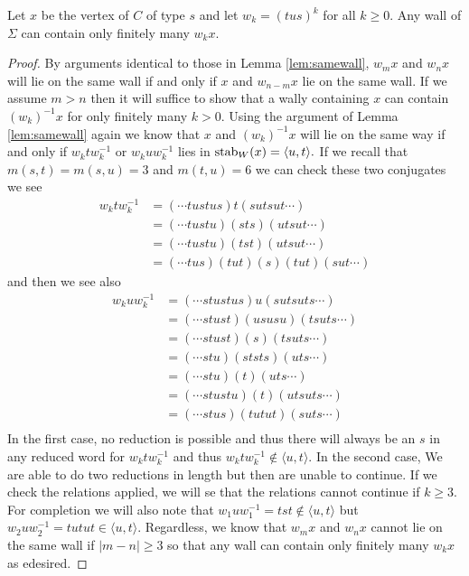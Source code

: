 \documentclass[class=book, crop=false]{standalone}
\begin{document}
\begin{lemma}
	\label{lem:336f2walls}
	Let $x$ be the vertex of $C$ of type $s$ and let $w_k=(tus)^k$ for all $k\ge 0.$ Any wall of $\Sigma$ can contain only finitely many $w_kx.$
\end{lemma}
\begin{proof}
	By arguments identical to those in Lemma \ref{lem:samewall}, $w_mx$ and $w_{n}x$ will lie on the same wall if and only if $x$ and $w_{n-m}x$ lie on the same wall. If we assume $m>n$ then it will suffice to show that a wally containing $x$ can contain $(w_k)^{-1}x$ for only finitely many $k>0.$ Using the argument of Lemma \ref{lem:samewall} again we know that $x$ and $(w_k)^{-1}x$ will lie on the same way if and only if $w_ktw_k^{-1}$ or $w_kuw_k^{-1}$ lies in $\mathrm{stab}_{W}(x)=\langle u,t\rangle.$ If we recall that $m(s,t)=m(s,u)=3$ and $m(t,u)=6$ we can check these two conjugates we see 
\begin{align*}
	w_ktw_k^{-1}&=(\cdots tustus)t(sutsut\cdots)\\
		    &=(\cdots tustu)(sts)(utsut\cdots)\\
		    &=(\cdots tustu)(tst)(utsut\cdots)\\
		    &=(\cdots tus)(tut)(s)(tut)(sut\cdots)
\end{align*}
and then we see also
\begin{align*}
	w_kuw_k^{-1}&=(\cdots stustus)u(sutsuts\cdots)\\
		    &=(\cdots stust)(ususu)(tsuts\cdots)\\
		    &=(\cdots stust)(s)(tsuts\cdots)\\
		    &=(\cdots stu)(ststs)(uts\cdots)\\
		    &=(\cdots stu)(t)(uts\cdots)\\
		    &=(\cdots stustu)(t)(utsuts\cdots)\\
		    &=(\cdots stus)(tutut)(suts\cdots)\\
\end{align*}
In the first case, no reduction is possible and thus there will always be an $s$ in any reduced word for $w_ktw_k^{-1}$ and thus $w_ktw_k^{-1}\not\in \langle u,t \rangle.$ In the second case, We are able to do two reductions in length but then are unable to continue. If we check the relations applied, we will se that the relations cannot continue if $k\ge 3.$ For completion we will also note that $w_1uw_1^{-1}=tst\not\in \langle u,t \rangle$ but $w_2uw_2^{-1}=tutut\in \langle u,t\rangle.$ Regardless, we know that $w_mx$ and $w_nx$ cannot lie on the same wall if $|m-n|\ge 3$ so that any wall can contain only finitely many $w_kx$ as edesired.

\end{proof}
\end{document}
